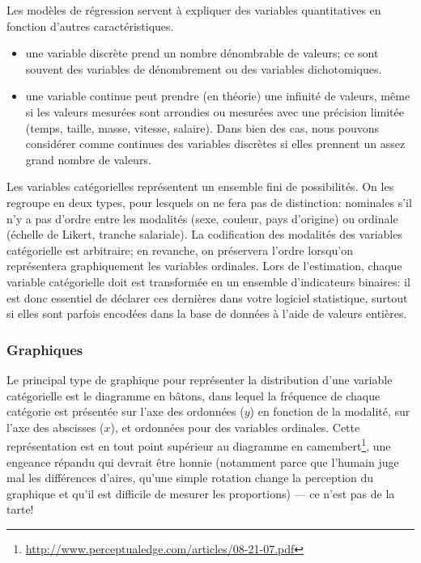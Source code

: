 \documentclass[
  11pt,
  letterpaper,
]{article}
\providecommand{\tightlist}{%
  \setlength{\itemsep}{0pt}\setlength{\parskip}{0pt}}
\renewcommand{\href}[2]{#2\footnote{\url{#1}}}
\theoremstyle{definition}
\theoremstyle{definition}
\theoremstyle{definition}
\theoremstyle{remark}
\begin{document}
Les modèles de régression servent à expliquer des variables quantitatives en fonction d'autres caractéristiques.

\begin{itemize}
\tightlist
\item
  une variable discrète prend un nombre dénombrable de valeurs; ce sont souvent des variables de dénombrement ou des variables dichotomiques.
\item
  une variable continue peut prendre (en théorie) une infinité de valeurs, même si les valeurs mesurées sont arrondies ou mesurées avec une précision limitée (temps, taille, masse, vitesse, salaire). Dans bien des cas, nous pouvons considérer comme continues des variables discrètes si elles prennent un assez grand nombre de valeurs.
\end{itemize}

Les variables catégorielles représentent un ensemble fini de possibilités. On les regroupe en deux types, pour lesquels on ne fera pas de distinction: nominales s'il n'y a pas d'ordre entre les modalités (sexe, couleur, pays d'origine) ou ordinale (échelle de Likert, tranche salariale). La codification des modalités des variables catégorielle est arbitraire; en revanche, on préservera l'ordre lorsqu'on représentera graphiquement les variables ordinales. Lors de l'estimation, chaque variable catégorielle doit est transformée en un ensemble d'indicateurs binaires: il est donc essentiel de déclarer ces dernières dans votre logiciel statistique, surtout si elles sont parfois encodées dans la base de données à l'aide de valeurs entières.

\hypertarget{graphiques}{%
\subsubsection{Graphiques}\label{graphiques}}

Le principal type de graphique pour représenter la distribution d'une variable catégorielle est le diagramme en bâtons, dans lequel la fréquence de chaque catégorie est présentée sur l'axe des ordonnées (\(y\)) en fonction de la modalité, sur l'axe des abscisses (\(x\)), et ordonnées pour des variables ordinales. Cette représentation est en tout point supérieur au \href{http://www.perceptualedge.com/articles/08-21-07.pdf}{diagramme en camembert}, une engeance répandu qui devrait être honnie (notamment parce que l'humain juge mal les différences d'aires, qu'une simple rotation change la perception du graphique et qu'il est difficile de mesurer les proportions) --- ce n'est pas de la tarte!
\end{document}
